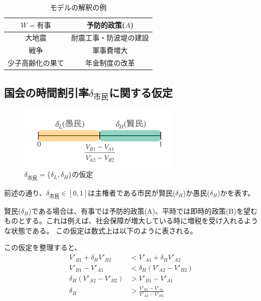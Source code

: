 \documentclass[main.tex]{subfiles}
\begin{document}
\begin{table}[htbp]
  \caption{モデルの解釈の例}
  \label{table:data_type}
  \centering
  \begin{tabular}{cc}
    \toprule
    $W=有事$ & 予防的政策($A$) \\
    \midrule
    大地震 & 耐震工事・防波堤の建設 \\
    戦争 & 軍事費増大 \\
    少子高齢化の果て & 年金制度の改革 \\
    \bottomrule
  \end{tabular}
\end{table}



\subsection{国会の時間割引率$\delta_{市民}$に関する仮定}

\begin{figure}[htbp]
  \centering
  \includegraphics[width=0.7\textwidth]{./image/assumption_citizen_discount_rate.png}
  \caption{$\delta_{市民}=\lbrace \delta_L, \delta_H \rbrace$の仮定} 
  \label{fig:assumption_citizen_discount_rate}
\end{figure}


前述の通り、$\delta_{市民}\in[0,1]$は主権者である市民が賢民($\delta_H$)か愚民($\delta_H$)かを表す。

賢民($\delta_H$)である場合は、有事では予防的政策(A)、平時では即時的政策(B)を望むものとする。これは例えば、社会保障が増大している時に増税を受け入れるような状態である。
この仮定は数式上は以下のように表される。

この仮定を整理すると、
\begin{align*}
  V'_{B1} + \delta_H V'_{B2} &< V'_{A1} + \delta_H V'_{A2}\\
  V'_{B1}-V'_{A1}  &<  \delta_H (V'_{A2} - V'_{B2}) \\
  \delta_H (V'_{A2} - V'_{B2}) &> V'_{B1}-V'_{A1} \\
  \delta_H &> \frac{V'_{B1}-V'_{A1}}{V'_{A2} - V'_{B2}}
\end{align*}
\end{document}
